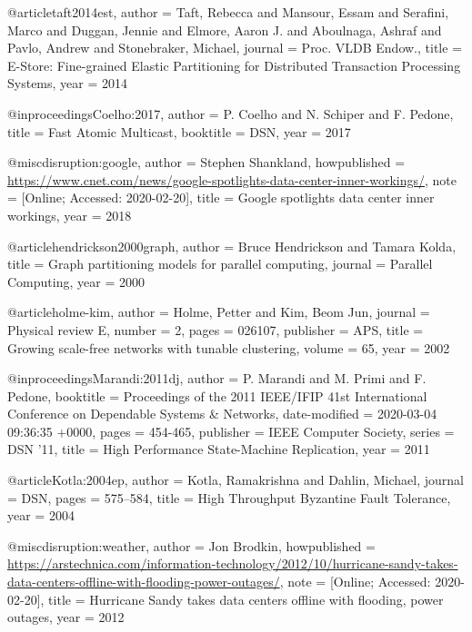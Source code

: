 @article{taft2014est,
  author  = {Taft, Rebecca and Mansour, Essam and Serafini, Marco and Duggan, Jennie and Elmore, Aaron J. and Aboulnaga, Ashraf and Pavlo, Andrew and Stonebraker, Michael},
  journal = {Proc. VLDB Endow.},
  title   = {{E-Store}: Fine-grained Elastic Partitioning for Distributed Transaction Processing Systems},
  year    = {2014}
}

@inproceedings{Coelho:2017,
  author    = {P. Coelho and N. Schiper and F. Pedone},
  title     = {Fast Atomic Multicast},
  booktitle = {DSN},
  year      = {2017}
}

@misc{disruption:google,
  author       = {Stephen Shankland},
  howpublished = {\url{https://www.cnet.com/news/google-spotlights-data-center-inner-workings/}},
  note         = {[Online; Accessed: 2020-02-20]},
  title        = {Google spotlights data center inner workings},
  year         = {2018}
}

@article{hendrickson2000graph,
  author  = {Bruce Hendrickson and Tamara Kolda},
  title   = {Graph partitioning models for parallel computing},
  journal = {Parallel Computing},
  year    = {2000}
}

@article{holme-kim,
  author    = {Holme, Petter and Kim, Beom Jun},
  journal   = {Physical review E},
  number    = {2},
  pages     = {026107},
  publisher = {APS},
  title     = {Growing scale-free networks with tunable clustering},
  volume    = {65},
  year      = {2002}
}

@inproceedings{Marandi:2011dj,
  author        = {P. Marandi and M. Primi and F. Pedone},
  booktitle     = {Proceedings of the 2011 IEEE/IFIP 41st International Conference on Dependable Systems \& Networks},
  date-modified = {2020-03-04 09:36:35 +0000},
  pages         = {454-465},
  publisher     = {{IEEE} Computer Society},
  series        = {DSN '11},
  title         = {High Performance State-Machine Replication},
  year          = {2011}
}

@article{Kotla:2004ep,
  author  = {Kotla, Ramakrishna and Dahlin, Michael},
  journal = {DSN},
  pages   = {575--584},
  title   = {{High Throughput Byzantine Fault Tolerance}},
  year    = {2004}
}

@misc{disruption:weather,
  author       = {Jon Brodkin},
  howpublished = {\url{https://arstechnica.com/information-technology/2012/10/hurricane-sandy-takes-data-centers-offline-with-flooding-power-outages/}},
  note         = {[Online; Accessed: 2020-02-20]},
  title        = {Hurricane Sandy takes data centers offline with flooding, power outages},
  year         = {2012}
}

